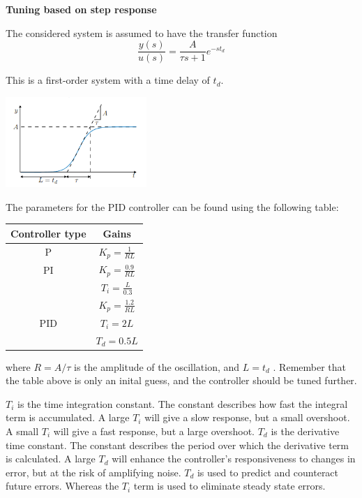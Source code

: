 \textbf{Tuning based on step response}

The considered system is assumed to have the transfer function
$$\frac{y(s)}{u(s)} = \frac{A}{\tau s + 1} e^{-st_d}$$

This is a first-order system with a time delay of $t_d$.

\begin{center}
	\includegraphics[width=0.4\textwidth]{Images/zieglerTuning.png}
\end{center}


The parameters for the PID controller can be found using the following table:
\begin{table}[H]
	\centering
	\begin{tabular}{|c|c|}
		\hline
		\cellcolor[HTML]{C0C0C0} \textbf{Controller type} & \cellcolor[HTML]{C0C0C0}\textbf{Gains} \\ \hline
		P                                                 & $K_p=\frac{1}{RL}$                     \\ \hline
		PI                                                & $K_p=\frac{0.9}{RL}$                   \\
		                                                  & $T_i=\frac{L}{0.3}$                    \\ \hline
		                                                  & $K_p=\frac{1.2}{RL}$                   \\
		PID                                               & $T_i=2L$                               \\
		                                                  & $T_d=0.5L$                             \\ \hline
	\end{tabular}
\end{table}

where $R=A/\tau$ is the amplitude of the oscillation, and $L = t_d$ . Remember that the table above
is only an inital guess, and the controller should be tuned further.


$T_i$ is the time integration constant. The constant describes how fast
the integral term is accumulated. A large $T_i$ will give a slow response, but
a small overshoot. A small $T_i$ will give a fast response, but a large overshoot.
$T_d$ is the derivative time constant. The constant describes the period over which
the derivative term is calculated.
A large $T_d$ will enhance the controller's responsiveness to changes in error,
but at the risk of amplifying noise.
$T_d$ is used to predict and counteract future errors.
Whereas the $T_i$ term is used to eliminate steady state errors.



